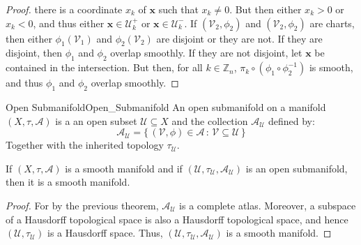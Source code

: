 \documentclass[oneside]{book}                                                  %
\begin{document}
\begin{proof}
                there is a coordinate $x_{k}$ of $\mathbf{x}$ such that
                $x_{k}\ne{0}$. But then either $x_{k}>0$ or $x_{k}<0$, and thus
                either $\mathbf{x}\in\mathcal{U}_{k}^{+}$ or
                $\mathbf{x}\in\mathcal{U}_{k}^{\minus}$. If
                $(\mathcal{V}_{2},\phi_{2})$ and $(\mathcal{V}_{2},\phi_{2})$
                are charts, then either $\phi_{1}(\mathcal{V}_{1})$
                and $\phi_{2}(\mathcal{V}_{2})$ are disjoint or they are not.
                If they are disjoint, then $\phi_{1}$ and $\phi_{2}$ overlap
                smoothly. If they are not disjoint, let $\mathbf{x}$ be contained
                in the intersection. But then, for all $k\in\mathbb{Z}_{n}$,
                $\pi_{k}\circ(\phi_{1}\circ\phi_{2}^{\minus{1}})$ is smooth,
                and thus $\phi_{1}$ and $\phi_{2}$ overlap smoothly.
            \end{proof}
            \begin{fdefinition}{Open Submanifold}{Open_Submanifold}
                An open submanifold on a manifold $(X,\tau,\mathcal{A})$ is a
                an open subset $\mathcal{U}\subseteq{X}$ and the collection
                $\mathcal{A}_{\mathcal{U}}$ defined by:
                \begin{equation}
                    \mathcal{A}_{\mathcal{U}}
                    =\{\,(\mathcal{V},\phi)\in\mathcal{A}\,:\,
                         \mathcal{V}\subseteq\mathcal{U}\,\}
                \end{equation}
                Together with the inherited topology $\tau_{\mathcal{U}}$.
            \end{fdefinition}
            \begin{theorem}
                If $(X,\tau,\mathcal{A})$ is a smooth manifold and if
                $(\mathcal{U},\tau_{\mathcal{U}},\mathcal{A}_{\mathcal{U}})$
                is an open submanifold, then it is a smooth manifold.
            \end{theorem}
            \begin{proof}
                For by the previous theorem, $\mathcal{A}_{\mathcal{U}}$ is a
                complete atlas. Moreover, a subspace of a Hausdorff topological
                space is also a Hausdorff topological space, and hence
                $(\mathcal{U},\tau_\mathcal{U})$ is a Hausdorff space. Thus,
                $(\mathcal{U},\tau_\mathcal{U},\mathcal{A}_{\mathcal{U}})$ is
                a smooth manifold.
            \end{proof}
\end{document}
